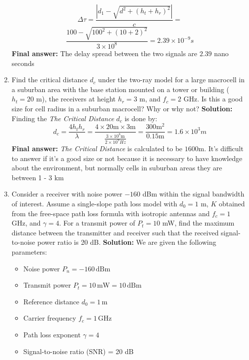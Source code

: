 \documentclass[a4paper,12pt]{book}
\begin{document}
\begin{enumerate}
		\[
		\Delta \tau = \frac{|d_1 - \sqrt{d^2 + (h_t + h_r)^2}|}{c}=
		\]
		\[\frac{100-\sqrt{100^2+(10+2)^2}}{3\times10^8}=2.39\times10^{-9}s\]
		\textbf{Final answer:} The delay spread between the two signals are \(2.39\) nano seconds
		
		\item Find the critical distance $d_c$ under the two-ray model for a large macrocell in a suburban area with the base station mounted on a tower or building ($h_t = 20$ m), the receivers at height $h_r = 3$ m, and $f_c = 2$ GHz. Is this a good size for cell radius in a suburban macrocell? Why or why not?
		\newline\newline
		\textbf{Solution:} Finding the \textit{The Critical Distance} \(d_c\) is done by:
		\[
		d_c = \frac{4 h_t h_r}{\lambda}=\frac{4\times20\text{m}\times3\text{m}}{\frac{3\times10^8\text{m}}{2\times10^9Hz}}=\frac{300\text{m}^2}{0.15\text{m}}=1.6\times10^{3}m
		\]
		\textbf{Final answer:} \textit{The Critical Distance} is calculated to be \(1600\text{m}\). It's difficult to answer if it's a good size or not because it is necessary to have knowledge about the environment, but normally cells in suburban areas they are between 1 - 3 km
		 
		\item Consider a receiver with noise power $-160$ dBm within the signal bandwidth of interest. Assume a single-slope path loss model with $d_0 = 1$ m, $K$ obtained from the free-space path loss formula with isotropic antennas and $f_c = 1$ GHz, and $\gamma = 4$. For a transmit power of $P_t = 10$ mW, find the maximum distance between the transmitter and receiver such that the received signal-to-noise power ratio is 20 dB.
		\newline\newline\noindent
		\textbf{Solution:} We are given the following parameters:
		\begin{itemize}
			\item Noise power \( P_n = -160 \, \text{dBm} \)
			\item Transmit power \( P_t = 10 \, \text{mW} = 10 \, \text{dBm} \)
			\item Reference distance \( d_0 = 1 \, \text{m} \)
			\item Carrier frequency \( f_c = 1 \, \text{GHz} \)
			\item Path loss exponent \( \gamma = 4 \)
			\item Signal-to-noise ratio (SNR) = 20 dB
		\end{itemize}
		

\end{enumerate}
\end{document}
